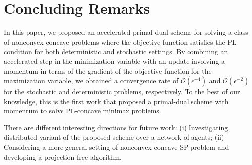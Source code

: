 \documentclass[letterpaper,11 pt]{article}
\newcommand{\mbrs}[1]{{\color{black}#1}}
\begin{document}
\section{Concluding Remarks}\label{sec:conclude}
In this paper, we proposed an accelerated primal-dual scheme for solving a class of nonconvex-concave problems where the objective function satisfies the PL condition for both deterministic and stochastic settings. By combining an accelerated step in the minimization variable with an update involving a momentum in terms of the gradient of the objective function for the maximization variable, we obtained a convergence rate of \mbrs{$\mathcal O(\epsilon^{-4})$} and $\mathcal O(\epsilon^{-2})$  for the stochastic and deterministic problems, respectively. To the best of our knowledge, this is the first work that proposed a primal-dual scheme with momentum to solve PL-concave minimax problems. 

There are different interesting directions for future work: (i)  Investigating distributed variant of the proposed scheme over a network of agents; (ii) Considering a more general setting of nonconvex-concave SP problem and  developing a projection-free algorithm. %
\end{document}
